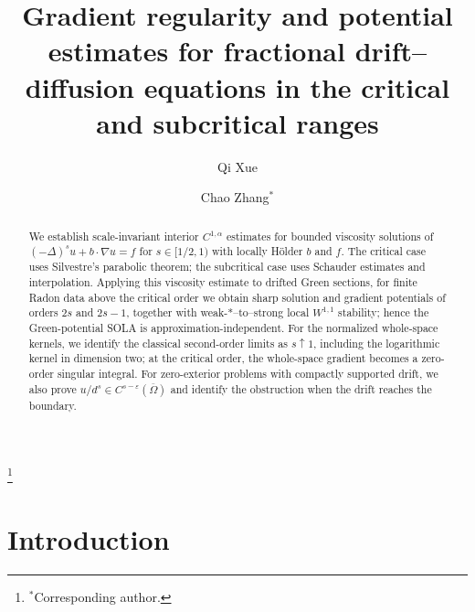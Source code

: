 \documentclass[reqno]{amsart}
\numberwithin{equation}{section}
\theoremstyle{plain}
\theoremstyle{definition}
\theoremstyle{remark}
\newcommand{\rev}[1]{#1}
\begin{document}
\title[Regularity for fractional drift--diffusion equations]
{Gradient regularity and potential estimates for fractional
drift--diffusion equations in the \rev{critical and subcritical ranges}}

\author[Q. Xue]{Qi Xue}
\address{Qi Xue \hfill\break School of Mathematics, Harbin Institute of Technology,
Harbin 150001, P.R. China}

\author[C. Zhang]{Chao Zhang$^*$}
\address{Chao Zhang \hfill\break School of Mathematics and Institute for Advanced Study in Mathematics,
Harbin Institute of Technology, Harbin 150001, P.R. China}
\thanks{$^*$Corresponding author.}


\begin{abstract}
We establish scale-invariant interior $C^{1,\alpha}$ estimates for bounded
viscosity solutions of
$(-\Delta)^su+b\cdot\nabla u=f$ for $s\in[1/2,1)$ with locally H\"older
$b$ and $f$.  The critical case uses Silvestre's parabolic theorem; the
subcritical case uses Schauder estimates and interpolation.  Applying this
viscosity estimate to drifted Green sections, for finite Radon data above
the critical order we obtain sharp solution and gradient potentials of
orders $2s$ and $2s-1$, together with weak-*--to--strong local $W^{1,1}$
stability; hence the Green-potential SOLA is approximation-independent.
For the normalized whole-space kernels, we identify the classical
second-order limits as $s\uparrow1$, including the logarithmic kernel in
dimension two; at the critical order, the whole-space gradient becomes a
zero-order singular integral.  For zero-exterior problems with compactly
supported drift, we also prove
$u/d^s\in C^{s-\varepsilon}(\overline\Omega)$ and identify the obstruction
when the drift reaches the boundary.
\end{abstract}

\maketitle

\section{Introduction}\label{sec:introduction}
\end{document}
